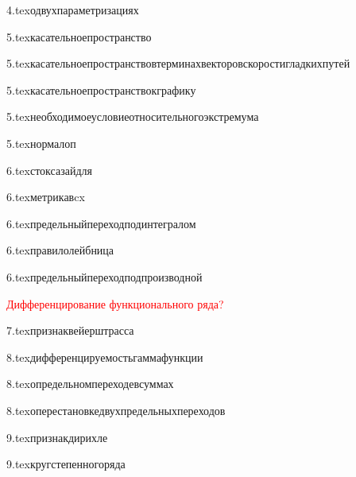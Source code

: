 {4.tex}{одвухпараметризациях}

{5.tex}{касательноепространство}

{5.tex}{касательноепространствовтерминахвекторовскоростигладкихпутей}

{5.tex}{касательноепространствокграфику}

{5.tex}{необходимоеусловиеотносительногоэкстремума}

{5.tex}{нормалоп}

{6.tex}{стоксазайдля}

{6.tex}{метрикавcx}

{6.tex}{предельныйпереходподинтегралом}

{6.tex}{правилолейбница}

{6.tex}{предельныйпереходподпроизводной}

\textcolor{red}{Дифференцирование функционального ряда?}

{7.tex}{признаквейерштрасса}

{8.tex}{дифференцируемостьгаммафункции}

{8.tex}{определьномпереходевсуммах}

{8.tex}{оперестановкедвухпредельныхпереходов}

{9.tex}{признакдирихле}

{9.tex}{кругстепенногоряда}

